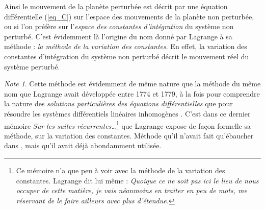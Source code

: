 \documentclass[12pt,paperletter, reqno]{amsart}
\theoremstyle{plain}
\theoremstyle{remark}
\newtheorem*{note}{Note}
\begin{document}
  Ainsi le mouvement de la planète perturbée est décrit par une équation différentielle (\ref{eq_C}) sur l'espace des mouvements de la planète non perturbée,
  ou si l'on préfère sur l'\emph{espace des constantes d'intégration} du système non perturbé.
  C'est évidemment là l'origine du nom donné par Lagrange à sa méthode :
  \emph{la méthode de la variation des constantes}.
  En effet,
  la variation des constantes d'intégration du système non perturbé décrit le mouvement réel du système perturbé.
  
  \begin{note}
    Cette méthode est évidemment de même nature que la méthode du même nom que Lagrange avait développée entre 1774 et 1779,
    à la fois pour comprendre la nature des \emph{solutions particulières des équations différentielles} \cite{Lagrange5,Lagrange7} que pour résoudre les systèmes différentiels linéaires inhomogènes \cite[Remarque 5, pages 159--165]{Lagrange6}.
    C'est dans ce dernier mémoire \emph{Sur les suites récurrentes\ldots}\footnote{Ce mémoire n'a que peu à voir avec la méthode de la variation des constantes. Lagrange dit lui même : \og\emph{Quoique ce ne soit pas ici le lieu de nous occuper de cette matière, je vais néanmoins en traiter en peu de mots, me réservant de le faire ailleurs avec plus d'étendue.}\fg{}} que Lagrange expose de façon formelle sa méthode,
    sur la variation des constantes.
    Méthode qu'il n'avait fait qu'ébaucher dans \cite{Lagrange5},
    mais qu'il avait déjà abondamment utilisée.
    

\end{note}
\end{document}
